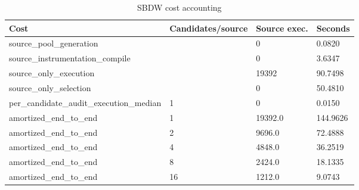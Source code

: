 \begin{table}[t]
\centering
\small
\begin{tabular}{llll}
\toprule
Cost & Candidates/source & Source exec. & Seconds \\
\midrule
source\_pool\_generation &  & 0 & 0.0820 \\
source\_instrumentation\_compile &  & 0 & 3.6347 \\
source\_only\_execution &  & 19392 & 90.7498 \\
source\_only\_selection &  & 0 & 50.4810 \\
per\_candidate\_audit\_execution\_median & 1 & 0 & 0.0150 \\
amortized\_end\_to\_end & 1 & 19392.0 & 144.9626 \\
amortized\_end\_to\_end & 2 & 9696.0 & 72.4888 \\
amortized\_end\_to\_end & 4 & 4848.0 & 36.2519 \\
amortized\_end\_to\_end & 8 & 2424.0 & 18.1335 \\
amortized\_end\_to\_end & 16 & 1212.0 & 9.0743 \\
\bottomrule
\end{tabular}
\caption{SBDW cost accounting}
\end{table}
